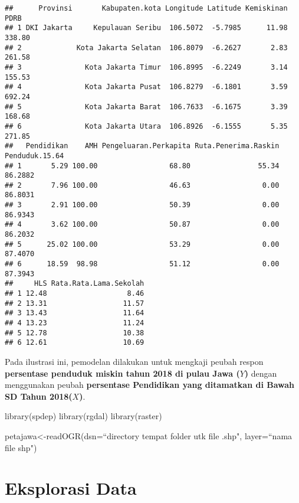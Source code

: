 \documentclass[
]{book}
\newenvironment{Shaded}{\begin{snugshade}}{\end{snugshade}}
\newcommand{\AttributeTok}[1]{\textcolor[rgb]{0.77,0.63,0.00}{#1}}
\newcommand{\FunctionTok}[1]{\textcolor[rgb]{0.00,0.00,0.00}{#1}}
\newcommand{\NormalTok}[1]{#1}
\newcommand{\OtherTok}[1]{\textcolor[rgb]{0.56,0.35,0.01}{#1}}
\newcommand{\StringTok}[1]{\textcolor[rgb]{0.31,0.60,0.02}{#1}}
\begin{document}
\begin{verbatim}
##      Provinsi       Kabupaten.kota Longitude Latitude Kemiskinan   PDRB
## 1 DKI Jakarta     Kepulauan Seribu  106.5072  -5.7985      11.98 338.80
## 2             Kota Jakarta Selatan  106.8079  -6.2627       2.83 261.58
## 3               Kota Jakarta Timur  106.8995  -6.2249       3.14 155.53
## 4               Kota Jakarta Pusat  106.8279  -6.1801       3.59 692.24
## 5               Kota Jakarta Barat  106.7633  -6.1675       3.39 168.68
## 6               Kota Jakarta Utara  106.8926  -6.1555       5.35 271.85
##   Pendidikan    AMH Pengeluaran.Perkapita Ruta.Penerima.Raskin Penduduk.15.64
## 1       5.29 100.00                 68.80                55.34        86.2882
## 2       7.96 100.00                 46.63                 0.00        86.8031
## 3       2.91 100.00                 50.39                 0.00        86.9343
## 4       3.62 100.00                 50.87                 0.00        86.2032
## 5      25.02 100.00                 53.29                 0.00        87.4070
## 6      18.59  98.98                 51.12                 0.00        87.3943
##     HLS Rata.Rata.Lama.Sekolah
## 1 12.48                   8.46
## 2 13.31                  11.57
## 3 13.43                  11.64
## 4 13.23                  11.24
## 5 12.78                  10.38
## 6 12.61                  10.69
\end{verbatim}

Pada ilustrasi ini, pemodelan dilakukan untuk mengkaji peubah respon \textbf{persentase penduduk miskin tahun 2018 di pulau Jawa (\(Y\))} dengan menggunakan peubah \textbf{persentase Pendidikan yang ditamatkan di Bawah SD Tahun 2018(\(X\))}.

\begin{Shaded}
\begin{Highlighting}[]
\FunctionTok{library}\NormalTok{(spdep)}
\FunctionTok{library}\NormalTok{(rgdal)}
\FunctionTok{library}\NormalTok{(raster)}

\NormalTok{petajawa}\OtherTok{\textless{}{-}}\FunctionTok{readOGR}\NormalTok{(}\AttributeTok{dsn=}\NormalTok{“directory tempat folder utk file .shp}\StringTok{", layer=“nama file shp"}\NormalTok{)}
\end{Highlighting}
\end{Shaded}

\hypertarget{eksplorasi-data}{%
\section{Eksplorasi Data}\label{eksplorasi-data}}
\end{document}
